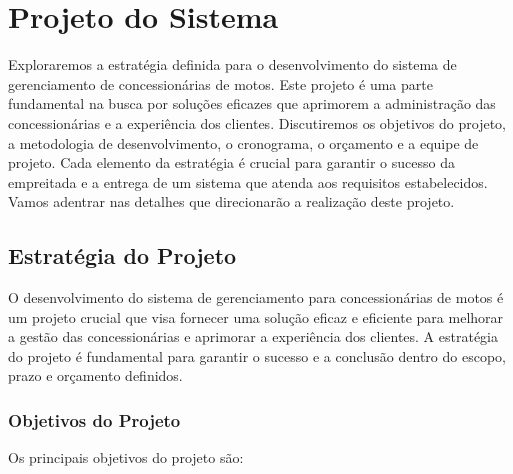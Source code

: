 
\chapter{Projeto do Sistema}

Exploraremos a estratégia definida para o desenvolvimento do sistema de gerenciamento de concessionárias de motos. Este projeto é uma parte fundamental na busca por soluções eficazes que aprimorem a administração das concessionárias e a experiência dos clientes. Discutiremos os objetivos do projeto, a metodologia de desenvolvimento, o cronograma, o orçamento e a equipe de projeto. Cada elemento da estratégia é crucial para garantir o sucesso da empreitada e a entrega de um sistema que atenda aos requisitos estabelecidos. Vamos adentrar nas detalhes que direcionarão a realização deste projeto.


\section{Estratégia do Projeto}

O desenvolvimento do sistema de gerenciamento para concessionárias de motos é um projeto crucial que visa fornecer uma solução eficaz e eficiente para melhorar a gestão das concessionárias e aprimorar a experiência dos clientes. A estratégia do projeto é fundamental para garantir o sucesso e a conclusão dentro do escopo, prazo e orçamento definidos.

\subsection{Objetivos do Projeto}

Os principais objetivos do projeto são:

